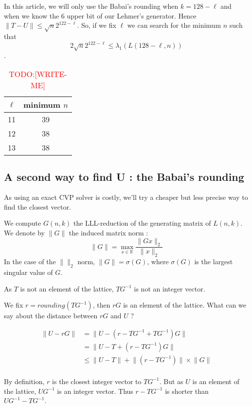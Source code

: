 \documentclass[preprint,svgnames]{iacrtrans}
\newcommand{\todo}[1]{\textcolor{red}{TODO:[#1]}}
\begin{document}
In this article, we will only use the Babai's rounding when \(k = 128-\ell\) and when we know the \(6\) upper bit of our Lehmer's generator. Hence \(\lVert T-U \rVert \leqslant \sqrt{n}2^{122-\ell} \). So, if we fix \(\ell\) we can search for the minimum \(n\) such that \[2\sqrt{n}2^{122-\ell} \leqslant \lambda_1(L(128-\ell,n))\].

\begin{table}
  \centering
    \begin{tabular}{|c|c|}
	\hline
	\(\ell\)  & minimum \(n\) \\
	\hline
	11 & 39 \\
	12 & 38 \\
	13 & 38 \\
	\hline
\end{tabular}
  \caption{\todo{WRITE-ME}}
  \label{tab:exact_cvp}
\end{table}

\subsection{A second way to find U : the Babai's rounding}

As using an exact CVP solver is costly, we'll try a cheaper but less precise way to find the closest vector.

We compute \(G(n,k)\) the LLL-reduction of the generating matrix of \(L(n,k)\). We denote by  \(\rVert G \lVert\) the induced matrix norm :
\[\rVert G \lVert =  \max_{x \in \mathbb{R}}\frac{\lVert Gx \rVert_2}{\lVert x \rVert_2}\]
In the case of the \(\lVert\rVert_2\) norm, \(\rVert G \lVert = \sigma(G)\), where \(\sigma(G)\) is the largest singular value of \(G\). 

\medskip

As \(T\) is not an element of the lattice, \(TG^{-1}\) is not an integer vector.

We fix \(r = rounding(TG^{-1}) \), then \(rG\) is an element of the lattice. What can we say about the distance between \(rG\) and \(U\) ?

\begin{align*}
\lVert U - rG \rVert &= \lVert U - (r-TG^{-1} + TG^{-1})G \rVert\\
&= \lVert U - T + (r-TG^{-1})G \rVert\\
&\leqslant \lVert U - T \rVert + \lVert(r-TG^{-1})\rVert \times \lVert G\rVert\\	
\end{align*}

By definition, \(r\) is the closest integer vector to \(TG^{-1}\). But as \(U\) is an element of the lattice, \(UG^{-1}\) is an integer vector. Thus \(r-TG^{-1}\) is shorter than \(UG^{-1}-TG^{-1}\).
\end{document}
